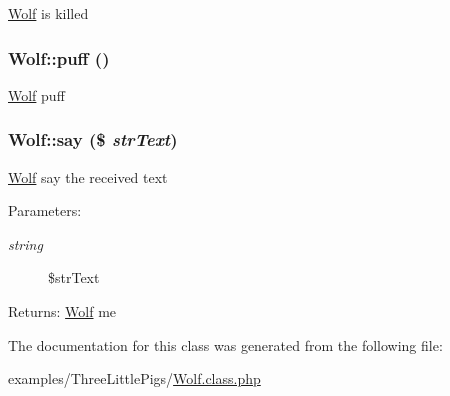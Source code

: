 \hyperlink{class_wolf}{Wolf} is killed \hypertarget{class_wolf_8ffe137382326ecef3081257c057794b}{
\subsubsection[{puff}]{\setlength{\rightskip}{0pt plus 5cm}Wolf::puff ()}}
\label{class_wolf_8ffe137382326ecef3081257c057794b}


\hyperlink{class_wolf}{Wolf} puff \hypertarget{class_wolf_2f051de20068c32049b0b665b2482c46}{
\subsubsection[{say}]{\setlength{\rightskip}{0pt plus 5cm}Wolf::say (\$ {\em strText})}}
\label{class_wolf_2f051de20068c32049b0b665b2482c46}


\hyperlink{class_wolf}{Wolf} say the received text

\begin{Desc}
\item[Parameters:]
\begin{description}
\item[{\em string}]\$strText \end{description}
\end{Desc}
\begin{Desc}
\item[Returns:]\hyperlink{class_wolf}{Wolf} me \end{Desc}


The documentation for this class was generated from the following file:\begin{CompactItemize}
\item 
examples/ThreeLittlePigs/\hyperlink{_wolf_8class_8php}{Wolf.class.php}\end{CompactItemize}
